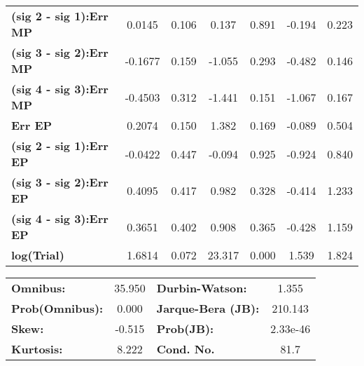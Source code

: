 \begin{center}
\begin{tabular}{lcccccc}
\textbf{(sig 2 - sig 1):Err MP} &       0.0145  &        0.106     &     0.137  &         0.891        &       -0.194    &        0.223     \\
\textbf{(sig 3 - sig 2):Err MP} &      -0.1677  &        0.159     &    -1.055  &         0.293        &       -0.482    &        0.146     \\
\textbf{(sig 4 - sig 3):Err MP} &      -0.4503  &        0.312     &    -1.441  &         0.151        &       -1.067    &        0.167     \\
\textbf{Err EP}                 &       0.2074  &        0.150     &     1.382  &         0.169        &       -0.089    &        0.504     \\
\textbf{(sig 2 - sig 1):Err EP} &      -0.0422  &        0.447     &    -0.094  &         0.925        &       -0.924    &        0.840     \\
\textbf{(sig 3 - sig 2):Err EP} &       0.4095  &        0.417     &     0.982  &         0.328        &       -0.414    &        1.233     \\
\textbf{(sig 4 - sig 3):Err EP} &       0.3651  &        0.402     &     0.908  &         0.365        &       -0.428    &        1.159     \\
\textbf{log(Trial)}             &       1.6814  &        0.072     &    23.317  &         0.000        &        1.539    &        1.824     \\
\bottomrule
\end{tabular}
\end{center}\begin{center}
\begin{tabular}{lclc}
\toprule
\textbf{Omnibus:}       & 35.950 & \textbf{  Durbin-Watson:     } &    1.355  \\
\textbf{Prob(Omnibus):} &  0.000 & \textbf{  Jarque-Bera (JB):  } &  210.143  \\
\textbf{Skew:}          & -0.515 & \textbf{  Prob(JB):          } & 2.33e-46  \\
\textbf{Kurtosis:}      &  8.222 & \textbf{  Cond. No.          } &     81.7  \\
\bottomrule
\end{tabular}
\end{center}



